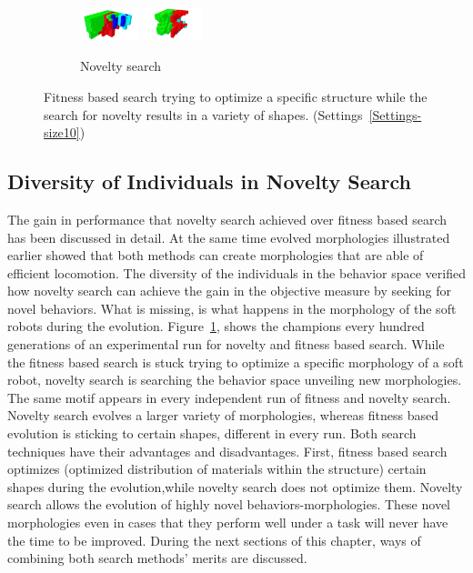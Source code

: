 \begin{figure}[t!]
\begin{subfigure}[b]{1.0\textwidth}
\includegraphics[width=0.19\textwidth]{../Figures/Robots/n_4_g_900.jpg}
\includegraphics[width=0.19\textwidth]{../Figures/Robots/n_4_g_1000.jpg}
\caption{Novelty search}
\end{subfigure}
\caption{Fitness based search trying to optimize a specific structure while the search for novelty results in a variety of shapes. (Settings~\ref{Settings-size10})}
\label{fig:morphologies}
\end{figure}


\subsection{Diversity of Individuals in Novelty Search}

The gain in performance that novelty search achieved over fitness based search has been discussed in detail.  At the same time evolved morphologies illustrated earlier showed that both methods can create morphologies that are able of efficient locomotion. The diversity of the individuals in the behavior space verified how novelty search can achieve the gain in the objective measure by seeking for novel behaviors. What is missing, is what happens in the morphology of the soft robots during the evolution. Figure~\ref{fig:morphologies}, shows the champions every hundred generations of an experimental run for novelty and fitness based search. While the fitness based search is stuck trying to optimize a specific morphology of a soft robot, novelty search is searching the behavior space unveiling new morphologies. The same motif appears in every independent run of fitness and novelty search. Novelty search evolves a larger variety of morphologies, whereas fitness based evolution is sticking to certain shapes, different in every run. Both search techniques have their advantages and disadvantages. First, fitness based search optimizes (optimized distribution of materials within the structure) certain shapes during the evolution,while novelty search does not optimize them. Novelty search allows the evolution of highly novel behaviors-morphologies. These novel morphologies even in cases that they perform well under a task will never have the time to be improved. During the next sections of this chapter, ways of combining both search methods' merits are discussed.

